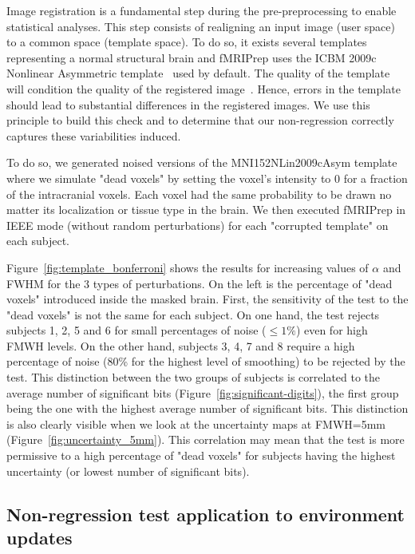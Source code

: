\documentclass{article}
\newcommand{\fmriprep}{fMRIPrep\xspace}
\begin{document}
Image registration is a fundamental step during the pre-preprocessing to enable statistical analyses. This step consists of realigning an input image (user space) to a common space (template space). To do so, it exists several templates representing a normal structural brain and \fmriprep uses the ICBM 2009c Nonlinear Asymmetric template~\cite{fonov2011unbiased} used by default. The quality of the template will condition the quality of the registered image~\cite{li2021moving}. Hence, errors in the template should lead to substantial differences in the registered images. We use this principle to build this check and to determine that our non-regression correctly captures these variabilities induced.

To do so, we generated noised versions of the MNI152NLin2009cAsym template where we simulate "dead voxels" by setting the voxel's intensity to 0 for a fraction of the intracranial voxels. Each voxel had the same probability to be drawn no matter its localization or tissue type in the brain. We then executed \fmriprep in IEEE mode (without random perturbations) for each "corrupted template" on each subject.

Figure~\ref{fig:template_bonferroni} shows the results for increasing values of $\alpha$ and FWHM for the 3 types of perturbations. On the left is the percentage of "dead voxels" introduced inside the masked brain. First, the sensitivity of the test to the "dead voxels" is not the same for each subject. On one hand, the test rejects subjects 1, 2, 5 and 6 for small percentages of noise ($\leq 1\%$) even for high FMWH levels. On the other hand, subjects 3, 4, 7 and 8 require a high percentage of noise (80\% for the highest level of smoothing) to be rejected by the test. This distinction between the two groups of subjects is correlated to the average number of significant bits (Figure~\ref{fig:significant-digits}), the first group being the one with the highest average number of significant bits. This distinction is also clearly visible when we look at the uncertainty maps at FMWH=5mm (Figure~\ref{fig:uncertainty_5mm}). This correlation may mean that the test is more permissive to a high percentage of "dead voxels" for subjects having the highest uncertainty (or lowest number of significant bits).

\subsection{Non-regression test application to environment updates}
\end{document}
